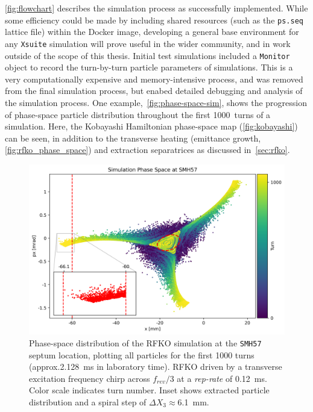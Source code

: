 \documentclass[11pt]{report}
\begin{document}
\autoref{fig:flowchart} describes the simulation process as successfully implemented. While some efficiency could be made by including shared resources (such as the \verb|ps.seq| lattice file) within the Docker image, developing a general base environment for any \verb|Xsuite| simulation will prove useful in the wider community, and in work outside of the scope of this thesis. Initial test simulations included a \verb|Monitor| object to record the turn-by-turn particle parameters of simulations. This is a very computationally expensive and memory-intensive process, and was removed from the final simulation process, but enabed detailed debugging and analysis of the simulation process. One example,~\autoref{fig:phase-space-sim}, shows the progression of phase-space particle distribution throughout the first \qty{1000}{turns} of a simulation. Here, the Kobayashi Hamiltonian phase-space map (\autoref{fig:kobayashi}) can be seen, in addition to the transverse heating (emittance growth, \autoref{fig:rfko_phase_space}) and extraction separatrices as discussed in~\autoref{sec:rfko}.

\begin{figure}[h]
  \centering
  \includegraphics[width=0.9\linewidth]{phase-space-sim.png}
  \cprotect\caption{Phase-space distribution of the RFKO simulation at the \verb|SMH57| septum location, plotting all particles for the first 1000 turns (approx.\qty{2.128}{\milli\second} in laboratory time). RFKO driven by a transverse excitation frequency chirp across $f_{rev}/3$ at a \textit{rep-rate} of \qty{0.12}{\milli\second}. Color scale indicates turn number. Inset shows extracted particle distribution and a spiral step of $\Delta X_3\approx$\qty{6.1}{\milli\meter}.}\label{fig:phase-space-sim}
\end{figure}
\end{document}
